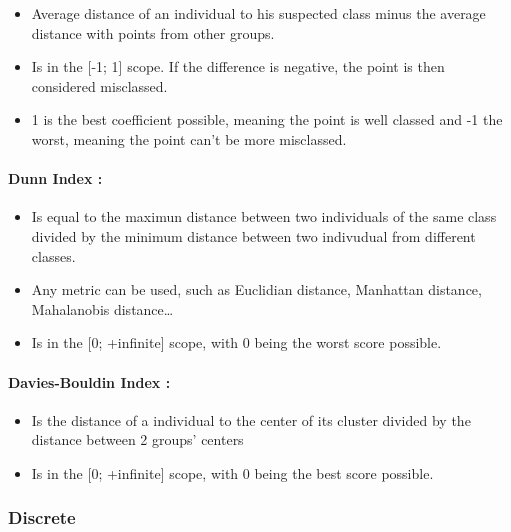 \documentclass[11pt]{article}
\providecommand{\tightlist}{%
      \setlength{\itemsep}{0pt}\setlength{\parskip}{0pt}}
\begin{document}
    \begin{itemize}
\tightlist
\item
  Average distance of an individual to his suspected class minus the
  average distance with points from other groups.
\item
  Is in the {[}-1; 1{]} scope. If the difference is negative, the point
  is then considered misclassed.
\item
  1 is the best coefficient possible, meaning the point is well classed
  and -1 the worst, meaning the point can't be more misclassed.
\end{itemize}

    \hypertarget{dunn-index}{%
\paragraph{Dunn Index :}\label{dunn-index}}

    \begin{itemize}
\tightlist
\item
  Is equal to the maximun distance between two individuals of the same
  class divided by the minimum distance between two indivudual from
  different classes.
\item
  Any metric can be used, such as Euclidian distance, Manhattan
  distance, Mahalanobis distance\ldots{}
\item
  Is in the {[}0; +infinite{]} scope, with 0 being the worst score
  possible.
\end{itemize}

    \hypertarget{davies-bouldin-index}{%
\paragraph{Davies-Bouldin Index :}\label{davies-bouldin-index}}

    \begin{itemize}
\tightlist
\item
  Is the distance of a individual to the center of its cluster divided
  by the distance between 2 groups' centers
\item
  Is in the {[}0; +infinite{]} scope, with 0 being the best score
  possible.
\end{itemize}

    \hypertarget{discrete}{%
\subsubsection{Discrete}\label{discrete}}
\end{document}
